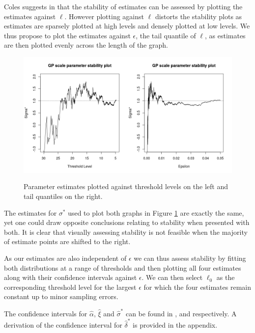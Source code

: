 \documentclass[honours,12pt,twoside, openright]{unswthesis}
\newcommand{\1}{\mathbf 1}
\numberwithin{equation}{section}
\theoremstyle{definition}
\theoremstyle{remark}
\begin{document}
Coles suggests in \cite{ColesBook} that the stability of estimates can be assessed by plotting the estimates against $\ell$. However plotting against $\ell$ distorts the stability plots as estimates are sparsely plotted at high levels and densely plotted at low levels. We thus propose to plot the estimates against $\epsilon$, the tail quantile of $\ell$, as estimates are then plotted evenly across the length of the graph.


	\begin{figure}[h]
        \centering
        \includegraphics[width=\textwidth]{Figures/ThresholdVsEpsilon}
        \label{fig:comparison}
        \caption{Parameter estimates plotted against threshold levels on the left and tail quantiles on the right.}
    \end{figure}

The estimates for $\sigma^{*}$ used to plot both graphs in Figure \ref{fig:comparison} are exactly the same, yet one could draw opposite conclusions relating to stability when presented with both. It is clear that visually assessing stability is not feasible when the majority of estimate points are shifted to the right.

As our estimates are also independent of $\epsilon$ we can thus assess stability by fitting both distributions at a range of thresholds and then plotting all four estimates along with their confidence intervals against $\epsilon$. We can then select $\ell_0$ as the corresponding threshold level for the largest $\epsilon$ for which the four estimates remain constant up to minor sampling errors.

The confidence intervals for $\hat\alpha$, $\hat\xi$ and $\hat\sigma^{*}$ can be found in \cite{Cahoy2013}, \cite{Zhang2007} and \cite{ColesBook} respectively. A derivation of the confidence interval for $\hat\delta^{*}$ is provided in the appendix.
\end{document}
